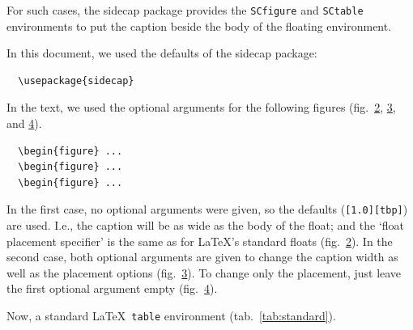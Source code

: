 \documentclass[a4paper]{article}
\begin{document}
\begin{figure}[h]
  \centering
  \caption[\SHORTCAPi]{\CAPi}
  \label{fig:standard}
\end{figure}

For such cases, the \textsf{sidecap} package provides the
\verb|SCfigure| and \verb|SCtable| environments to put the
caption beside the body of the floating environment.

In this document, we used the defaults of the \textsf{sidecap} package:
%
\begin{verbatim}
  \usepackage{sidecap}
\end{verbatim}
%
In the text, we used the optional arguments for the following figures
(fig.~\ref{fig:sc1}, \ref{fig:sc2}, and \ref{fig:sc3}).
%
\begin{verbatim}
  \begin{figure} ...
  \begin{figure} ...
  \begin{figure} ...
\end{verbatim}
%
In the first case, no optional arguments were given, so the defaults
(\verb|[1.0][tbp]|) are used. I.e., the caption will be as wide as
the body of the float; and the `float placement specifier' is the same
as for \LaTeX's standard floats (fig.~\ref{fig:sc1}).
In the second case, both optional arguments are given to change the
caption width as well as the placement options (fig.~\ref{fig:sc2}).
To change only the placement, just leave the first optional argument
empty (fig.~\ref{fig:sc3}).

\begin{figure}
  \caption[\SHORTCAPi]{\CAPi}
  \label{fig:sc1}
\end{figure}

\begin{figure}
  \caption[\SHORTCAPi]{\CAPi}
  \label{fig:sc2}
\end{figure}

\begin{figure}
  \caption[\SHORTCAPi]{\CAPi}
  \label{fig:sc3}
\end{figure}

\clearpage

Now, a standard \LaTeX\ \texttt{table} environment
(tab.~\ref{tab:standard}).

\begin{table}[h]
  \centering
  \caption[\SHORTCAPi]{\CAPi}
  \TABi%
  \label{tab:standard}
\end{table}
\end{document}
